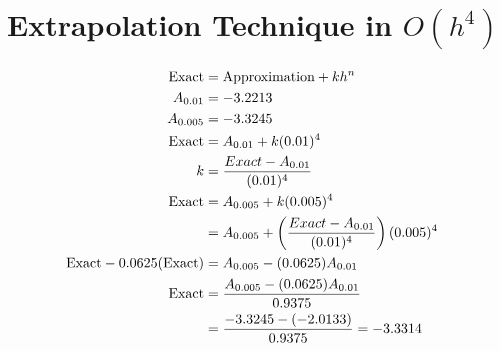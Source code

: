 \section{Extrapolation Technique in $O(h^{4})$}
	\begin{align}
		\text{Exact} &= \text{Approximation} + kh^{n}& \\
		A_{0.01} &= -3.2213& \\
		A_{0.005} &= -3.3245& \\
		\text{Exact} &= A_{0.01} + k(0.01)^{4}& \notag \\
		k &= \frac{Exact - A_{0.01}}{(0.01)^{4}}& \\
		\text{Exact} &= A_{0.005} + k(0.005)^{4}& \notag \\
		&= A_{0.005} + \left(\frac{Exact - A_{0.01}}{(0.01)^{4}}\right)(0.005)^{4}& \notag \\
		\text{Exact} - 0.0625(\text{Exact}) &= A_{0.005} - (0.0625)A_{0.01}& \notag \\
		\text{Exact} &= \frac{A_{0.005} - (0.0625)A_{0.01}}{0.9375}& \notag \\
		&= \frac{-3.3245-(-2.0133)}{0.9375} = -3.3314&
	\end{align}
